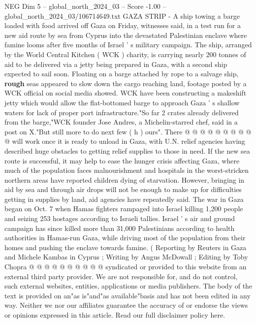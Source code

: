 \begin{textsample}{NEG Dim 5 – global\_north\_2024\_03 – Score -1.00 – global\_north\_2024\_03/106714649.txt}  \label{ex:f5_neg_164}
GAZA STRIP - A ship towing a barge loaded with food arrived off Gaza on Friday, witnesses said, in a test run for a new aid route by sea from Cyprus into the devastated Palestinian enclave where famine looms after five months of Israel ' s military campaign.
The ship, arranged by the World Central Kitchen ( WCK ) charity, is carrying nearly 200 tonnes of aid to be delivered via a jetty being prepared in Gaza, with a second ship expected to sail soon.
Floating on a barge attached by rope to a salvage ship, \textbf{rough} seas appeared to slow down the cargo reaching land, footage posted by a WCK official on social media showed.
WCK have been constructing a makeshift jetty which would allow the flat-bottomed barge to approach Gaza ' s shallow waters for lack of proper port infrastructure."So far 2 crates already delivered from the barge,"WCK founder Jose Andres, a Michelin-starred chef, said in a post on X."But still more to do next few ( h ) ours".
There @ @ @ @ @ @ @ @ @ @ will work once it is ready to unload in Gaza, with U.N. relief agencies having described huge obstacles to getting relief supplies to those in need.
If the new sea route is successful, it may help to ease the hunger crisis affecting Gaza, where much of the population faces malnourishment and hospitals in the worst-stricken northern areas have reported children dying of starvation.
However, bringing in aid by sea and through air drops will not be enough to make up for difficulties getting in supplies by land, aid agencies have repeatedly said.
The war in Gaza began on Oct. 7 when Hamas fighters rampaged into Israel killing 1,200 people and seizing 253 hostages according to Israeli tallies.
Israel ' s air and ground campaign has since killed more than 31,000 Palestinians according to health authorities in Hamas-run Gaza, while driving most of the population from their homes and pushing the enclave towards famine. ( Reporting by Reuters in Gaza and Michele Kambas in Cyprus ; Writing by Angus McDowall ; Editing by Toby Chopra @ @ @ @ @ @ @ @ @ @ syndicated or provided to this website from an external third party provider.
We are not responsible for, and do not control, such external websites, entities, applications or media publishers.
The body of the text is provided on an"as is"and"as available"basis and has not been edited in any way.
Neither we nor our affiliates guarantee the accuracy of or endorse the views or opinions expressed in this article.
Read our full disclaimer policy here.

\end{textsample}
